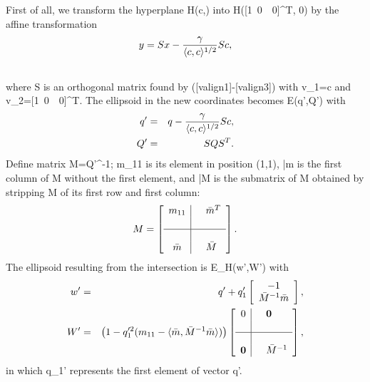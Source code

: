 \documentclass[letterpaper,10pt,english]{sphinxmanual}
\begin{document}
First of all, we transform the hyperplane H(c,\gamma) into
H([1~0~\cdots~0]^T, 0) by the affine transformation
\begin{gather}
\begin{split}y = Sx - \frac{\gamma}{\langle c,c\rangle^{1/2}}Sc,\end{split}\notag\\\begin{split}\end{split}\notag
\end{gather}
where S is an orthogonal matrix found by ({[}valign1{]}-{[}valign3{]})
with v_1=c and v_2=[1~0~\cdots~0]^T. The ellipsoid in
the new coordinates becomes {\mathcal E}(q',Q') with
\begin{gather}
\begin{split}\begin{aligned}
q' & = & q-\frac{\gamma}{\langle c,c\rangle^{1/2}}Sc, \\
Q' & = & SQS^T.\end{aligned}\end{split}\notag
\end{gather}
Define matrix M=Q'^{-1}; m_{11} is its element in
position (1,1), \bar{m} is the first column of M
without the first element, and \bar{M} is the submatrix of
M obtained by stripping M of its first row and first
column:
\begin{gather}
\begin{split}M = \left[\begin{array}{c|cl}
m_{11} & & \bar{m}^T\\
 & \\
\hline
 & \\
\bar{m} & & \bar{M}\end{array}\right].\end{split}\notag
\end{gather}
The ellipsoid resulting from the intersection is
{\mathcal E}_H(w',W') with
\begin{gather}
\begin{split}\begin{aligned}
w' & = & q' + q_1'\left[\begin{array}{c}
-1\\
\bar{M}^{-1}\bar{m}\end{array}\right],\\
W' & = & \left(1-q_1'^2(m_{11}-
\langle\bar{m},\bar{M}^{-1}\bar{m}\rangle)\right)\left[\begin{array}{c|cl}
0 & & {\bf 0}\\
 & \\
\hline
 & \\
{\bf 0} & & \bar{M}^{-1}\end{array}\right],\end{aligned}\end{split}\notag
\end{gather}
in which q_1' represents the first element of vector q'.
\end{document}
